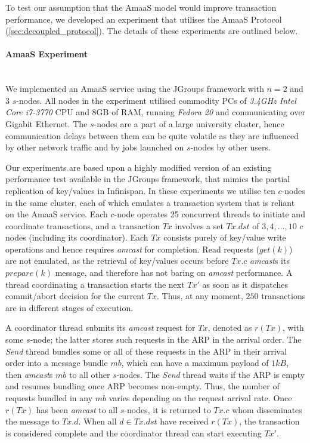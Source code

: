 To test our assumption that the \textsf{AmaaS} model would improve transaction performance, we developed an experiment that utilises the \textsf{AmaaS} Protocol (\ref{sec:decoupled_protocol}).  The details of these experiments are outlined below. 

\paragraph{AmaaS Experiment} \hspace{0pt} \\
We implemented an \textsf{AmaaS} service using the JGroups\citep{JGroups} framework with $n=2$ and $3$ $s$-nodes.  All nodes in the experiment utilised commodity PCs of \emph{3.4GHz Intel Core i7-3770} CPU and 8GB of RAM, running \emph{Fedora 20} and communicating over Gigabit Ethernet. The $s$-nodes are a part of a large university cluster, hence communication delays between them can be quite volatile as they are influenced by other network traffic and by jobs launched on $s$-nodes by other users.

Our experiments are based upon a highly modified version of an existing performance test available in the JGroups\citep{JGroups} framework, that mimics the partial replication of key/values in Infinispan\citep{Infinispan}.  In these experiments we utilise ten $c$-nodes in the same cluster, each of which emulates a transaction system that is reliant on the \textsf{AmaaS} service.  Each $c$-node operates 25 concurrent threads to initiate and coordinate transactions, and a transaction $Tx$ involves a set $Tx.dst$ of $3,4,\ldots,10$ $c$ nodes (including its coordinator). Each $Tx$ consists purely of key/value write operations and hence requires \emph{amcast} for completion. Read requests ($get(k)$) are not emulated, as the retrieval of key/values occurs before $Tx.c$ \emph{amcast}s its $prepare(k)$ message, and therefore has not baring on \emph{amcast} performance.  A thread coordinating a transaction starts the next $Tx'$ as soon as it dispatches commit/abort decision for the current $Tx$. Thus, at any moment, $250$ transactions are in different stages of execution.

A coordinator thread submits its \emph{amcast} request for $Tx$, denoted as $r(Tx)$, with some $s$-node; the latter stores such requests in the ARP in the arrival order. The \emph{Send} thread bundles some or all of these requests in the ARP in their arrival order into a message bundle $mb$, which can have a maximum payload of $1kB$, then \emph{amcast}s $mb$ to all other $s$-nodes.  The \emph{Send} thread waits if the ARP is empty and resumes bundling once ARP becomes non-empty. Thus, the number of requests bundled in any $mb$ varies depending on the request arrival rate. Once $r(Tx)$ has been \emph{amcast} to all $s$-nodes, it is returned to $Tx.c$ whom disseminates the message to $Tx.d$.  When all $d \in Tx.dst$ have received $r(Tx)$, the transaction is considered complete and the coordinator thread can start executing $Tx'$.  

